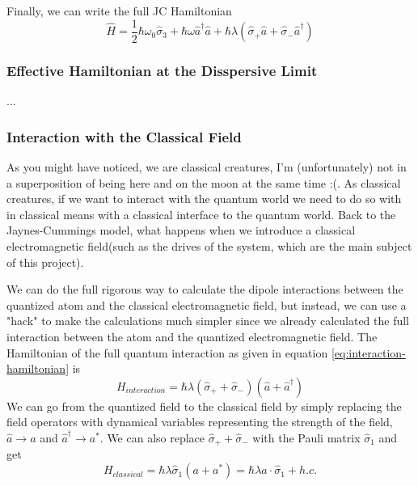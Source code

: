 \documentclass[english, a4paper, 12pt, twoside]{article}
\numberwithin{equation}{section} %
\begin{document}
\par

Finally, we can write the full JC Hamiltonian
\begin{equation}
    \boxed{\hat{H} = \frac{1}{2}\hbar \omega_0\hat{\sigma}_3 
                     + \hbar \omega \hat{a}^\dag \hat{a} 
                     +  \hbar\lambda(\hat{\sigma}_+\hat{a} + \hat{\sigma}_-\hat{a}^\dag)}
\end{equation}

\subsubsection{Effective Hamiltonian at the Disspersive Limit}
...

\subsubsection{Interaction with the Classical Field} \label{sec:interaction-with_classical-field}
As you might have noticed, we are classical creatures, I'm (unfortunately) not in a superposition of being here and on the moon at the same time :(. As classical creatures, if we want to interact with the quantum world we need to do so with in classical means with a classical interface to the quantum world. Back to the Jaynes-Cummings model, what happens when we introduce a classical electromagnetic field(such as the drives of the system, which are the main subject of this project).

We can do the full rigorous way to calculate the dipole interactions between the quantized atom and the classical electromagnetic field, but instead, we can use a "hack" to make the calculations much simpler since we already calculated the full interaction between the atom and the quantized electromagnetic field. The Hamiltonian of the full quantum interaction as given in equation \ref{eq:interaction-hamiltonian} is
\[
    H_{interaction} = \hbar \lambda (\hat{\sigma}_+ + \hat{\sigma}_-)(\hat{a} + \hat{a}^\dag)
\]
We can go from the quantized field to the classical field by simply replacing the field operators with dynamical variables representing the strength of the field, $\hat{a} \rightarrow a$ and $\hat{a}^\dag \rightarrow a^*$. We can also replace $\hat{\sigma}_+ + \hat{\sigma}_-$ with the Pauli matrix $\hat{\sigma}_1$ and get
\begin{equation}\label{eq:atom-field-class-int}
    H_{classical} = \hbar \lambda \hat{\sigma}_1(a + a^*) = \hbar \lambda a \cdot \hat{\sigma}_1 + h.c.
\end{equation}
\end{document}
